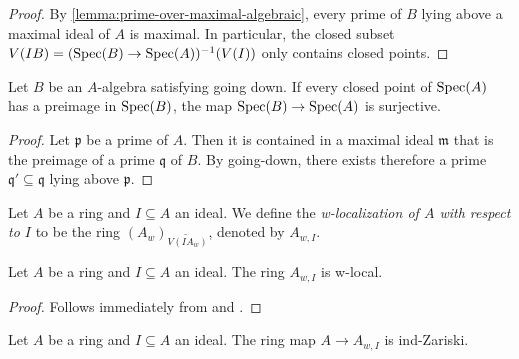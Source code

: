 \begin{proof}
    \leanok
    By \ref{lemma:prime-over-maximal-algebraic}, every prime of $B$ lying above a maximal ideal of $A$
    is maximal. In particular, the closed subset $V(I B) = (\mathrm{Spec}(B) \to \mathrm{Spec}(A))^{-1}(V(I))$ only contains
    closed points.
\end{proof}

\begin{lemma}
    Let $B$ be an $A$-algebra satisfying going down. If every closed point of $\mathrm{Spec}(A)$
    has a preimage in $\mathrm{Spec}(B)$, the map $\mathrm{Spec}(B) \to \mathrm{Spec}(A)$ is surjective.
    \label{lemma:going-down-surjective-of-closed}
    \leanok
\end{lemma}

\begin{proof}
    \leanok
    Let $\mathfrak{p}$ be a prime of $A$. Then it is contained in a maximal ideal $\mathfrak{m}$
    that is the preimage of a prime $\mathfrak{q}$ of $B$. By going-down, there
    exists therefore a prime $\mathfrak{q}' \subseteq \mathfrak{q}$ lying above $\mathfrak{p}$.
\end{proof}

\begin{definition}
  Let $A$ be a ring and $I \subseteq A$ an ideal. We define the \emph{w-localization of $A$ with respect to $I$} to be the ring $(A_w)_{\widetilde{V(IA_{w})}}$, denoted by $A_{w,I}$.
  \label{def:w-localization-ideal}
  \leanok
\end{definition}

\begin{lemma}
  Let $A$ be a ring and $I \subseteq A$ an ideal. The ring $A_{w,I}$ is w-local.
  \label{lemma:w-localization-ideal-w-local}
  \leanok
\end{lemma}

\begin{proof}
  \leanok
  Follows immediately from  and .
\end{proof}

\begin{lemma}
  Let $A$ be a ring and $I \subseteq A$ an ideal. The ring map $A \to A_{w, I}$ is ind-Zariski.
  \label{thm:w-localization-ideal-ind-Zariski}
  \leanok
\end{lemma}

